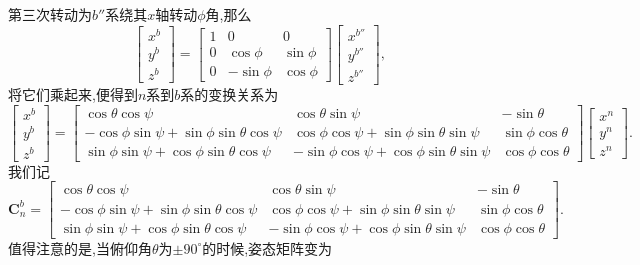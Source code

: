 \documentclass[10pt,a4paper]{ctexbook}
\theoremstyle{definition}
\begin{document}
第三次转动为$b''$系绕其$x$轴转动$\phi$角,那么
\[
    \begin{bmatrix}
        x^{b} \\ y^{b} \\ z^{b}
    \end{bmatrix}=\begin{bmatrix}
        1 & 0 & 0 \\
        0 & \cos\phi & \sin\phi \\
        0 & -\sin\phi & \cos\phi
    \end{bmatrix}\begin{bmatrix}
        x^{b''} \\ y^{b''} \\ z^{b''}
    \end{bmatrix},
\]
将它们乘起来,便得到$n$系到$b$系的变换关系为
\begin{equation}
    \begin{bmatrix}
        x^b \\ y^b \\ z^b
    \end{bmatrix}=\begin{bmatrix}
        \cos\theta\cos\psi & \cos\theta\sin\psi & -\sin\theta \\
        -\cos\phi\sin\psi + \sin\phi\sin\theta\cos\psi & \cos\phi\cos\psi+\sin\phi\sin\theta\sin\psi & \sin\phi\cos\theta \\
        \sin\phi\sin\psi + \cos\phi\sin\theta\cos\psi & -\sin\phi\cos\psi+\cos\phi\sin\theta\sin\psi & \cos\phi\cos\theta
    \end{bmatrix}\begin{bmatrix}
        x^n \\ y^n \\ z^n
    \end{bmatrix}.
\end{equation}
我们记
\[
    \mathbf{C}_n^b=\begin{bmatrix}
        \cos\theta\cos\psi & \cos\theta\sin\psi & -\sin\theta \\
        -\cos\phi\sin\psi + \sin\phi\sin\theta\cos\psi & \cos\phi\cos\psi+\sin\phi\sin\theta\sin\psi & \sin\phi\cos\theta \\
        \sin\phi\sin\psi + \cos\phi\sin\theta\cos\psi & -\sin\phi\cos\psi+\cos\phi\sin\theta\sin\psi & \cos\phi\cos\theta
    \end{bmatrix}.
\]
值得注意的是,当俯仰角$\theta$为$\pm 90^{\circ}$的时候,姿态矩阵变为
\end{document}
